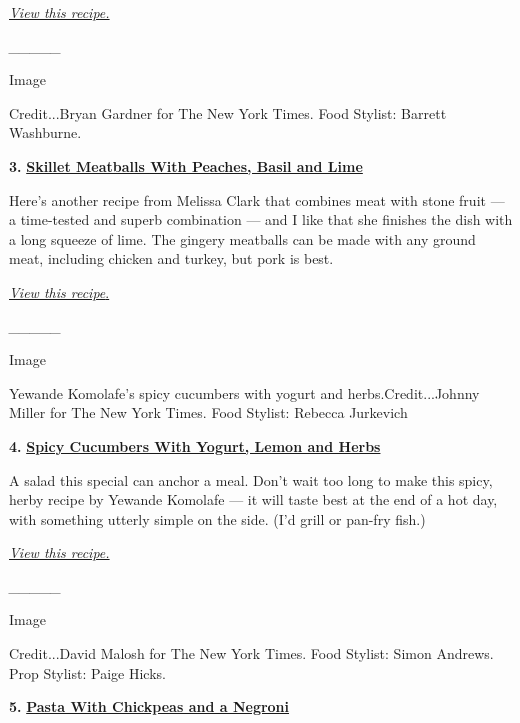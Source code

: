 \href{https://cooking.nytimes3xbfgragh.onion/recipes/1021337-sook-mei-faan-cantonese-creamed-corn-with-tofu-and-rice}{\emph{View
this recipe.}}

\emph{\_\_\_\_\_}

Image

Credit...Bryan Gardner for The New York Times. Food Stylist: Barrett
Washburne.

\textbf{3.}
\href{https://cooking.nytimes3xbfgragh.onion/recipes/1021402-skillet-meatballs-with-peaches-basil-and-lime}{\textbf{Skillet
Meatballs With Peaches, Basil and Lime}}

Here's another recipe from Melissa Clark that combines meat with stone
fruit --- a time-tested and superb combination --- and I like that she
finishes the dish with a long squeeze of lime. The gingery meatballs can
be made with any ground meat, including chicken and turkey, but pork is
best.

\emph{\href{https://cooking.nytimes3xbfgragh.onion/recipes/1021402-skillet-meatballs-with-peaches-basil-and-lime}{View
this
recipe}}\href{https://cooking.nytimes3xbfgragh.onion/recipes/1021402-skillet-meatballs-with-peaches-basil-and-lime}{.}

\emph{\_\_\_\_\_}

Image

Yewande Komolafe's spicy cucumbers with yogurt and herbs.Credit...Johnny
Miller for The New York Times. Food Stylist: Rebecca Jurkevich

\textbf{4.}
\href{https://cooking.nytimes3xbfgragh.onion/recipes/1021278-spicy-cucumbers-with-yogurt-lemon-and-herbs}{\textbf{Spicy
Cucumbers With Yogurt, Lemon and Herbs}}

A salad this special can anchor a meal. Don't wait too long to make this
spicy, herby recipe by Yewande Komolafe --- it will taste best at the
end of a hot day, with something utterly simple on the side. (I'd grill
or pan-fry fish.)

\href{https://cooking.nytimes3xbfgragh.onion/recipes/1021278-spicy-cucumbers-with-yogurt-lemon-and-herbs}{\emph{View
this recipe.}}

\emph{\_\_\_\_\_}

Image

Credit...David Malosh for The New York Times. Food Stylist: Simon
Andrews. Prop Stylist: Paige Hicks.

\textbf{5.}
\href{https://cooking.nytimes3xbfgragh.onion/recipes/1020019-pasta-with-chickpeas-and-a-negroni}{\textbf{Pasta
With Chickpeas and a Negroni}}

